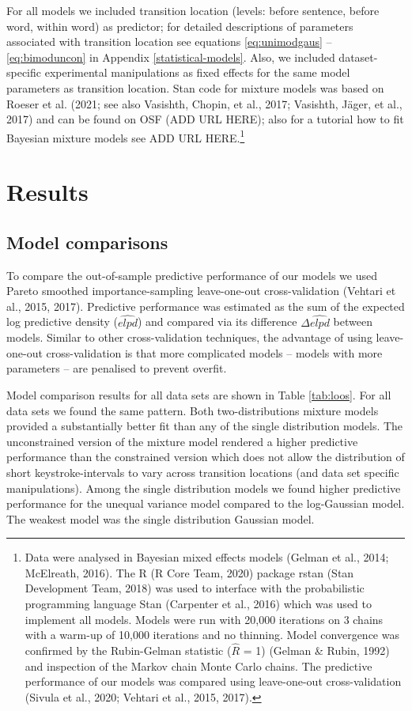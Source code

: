 \documentclass[
  english,
  man,floatsintext]{apa7}
\begin{document}
For all models we included transition location (levels: before sentence, before word, within word) as predictor; for detailed descriptions of parameters associated with transition location see equations \ref{eq:unimodgaus} -- \ref{eq:bimoduncon} in Appendix \ref{statistical-models}. Also, we included dataset-specific experimental manipulations as fixed effects for the same model parameters as transition location. Stan code for mixture models was based on Roeser et al. (2021; see also Vasishth, Chopin, et al., 2017; Vasishth, Jäger, et al., 2017) and can be found on OSF (ADD URL HERE); also for a tutorial how to fit Bayesian mixture models see ADD URL HERE.\footnote{Data were analysed in Bayesian mixed effects models (Gelman et al., 2014; McElreath, 2016). The R (R Core Team, 2020) package rstan (Stan Development Team, 2018) was used to interface with the probabilistic programming language Stan (Carpenter et al., 2016) which was used to implement all models. Models were run with 20,000 iterations on 3 chains with a warm-up of 10,000 iterations and no thinning. Model convergence was confirmed by the Rubin-Gelman statistic (\(\hat{R}\) = 1) (Gelman \& Rubin, 1992) and inspection of the Markov chain Monte Carlo chains. The predictive performance of our models was compared using leave-one-out cross-validation (Sivula et al., 2020; Vehtari et al., 2015, 2017).}

\hypertarget{results}{%
\section{Results}\label{results}}

\hypertarget{model-comparisons}{%
\subsection{Model comparisons}\label{model-comparisons}}

To compare the out-of-sample predictive performance of our models we used Pareto smoothed importance-sampling leave-one-out cross-validation (Vehtari et al., 2015, 2017). Predictive performance was estimated as the sum of the expected log predictive density (\(\widehat{elpd}\)) and compared via its difference \(\Delta\widehat{elpd}\) between models. Similar to other cross-validation techniques, the advantage of using leave-one-out cross-validation is that more complicated models -- models with more parameters -- are penalised to prevent overfit.

Model comparison results for all data sets are shown in Table \ref{tab:loos}. For all data sets we found the same pattern. Both two-distributions mixture models provided a substantially better fit than any of the single distribution models. The unconstrained version of the mixture model rendered a higher predictive performance than the constrained version which does not allow the distribution of short keystroke-intervals to vary across transition locations (and data set specific manipulations). Among the single distribution models we found higher predictive performance for the unequal variance model compared to the log-Gaussian model. The weakest model was the single distribution Gaussian model.
\end{document}
